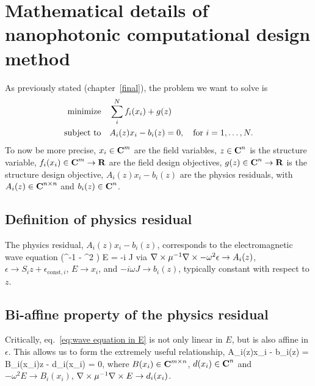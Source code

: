 \renewcommand{\eq}[1]{eq.~\eqref{eq:#1}}
\renewcommand{\EE}[2]{\begin{subequations}\begin{align}#2\end{align}\label{eq:#1}\end{subequations}}
\chapter[Computational design mathematics]{Mathematical details of nanophotonic computational design method} 
\label{maths}
As previously stated (chapter~\ref{final}), the problem we want to solve is 
    \EE {rigorous problem statement}
        {\minimize&  \sum_i^N f_i(x_i) + g(z) \\
        \subto&     A_i(z)x_i - b_i(z) = 0,\quad\text{for $i = 1, \ldots, N.$}}
To now be more precise,
    \BI $x_i \in {\mbox{\bf C}}^m$ are the field variables,
    \I  $z \in {\mbox{\bf C}}^n$ is the structure variable,
    \I  $f_i(x_i) \in {\mbox{\bf C}}^m \to {\mbox{\bf R}}$ are the field design objectives,
    \I  $g(z) \in {\mbox{\bf C}}^n \to {\mbox{\bf R}}$ is the structure design objective,
    \I  $A_i(z)x_i - b_i(z)$ are the physics residuals, with
    \I  $A_i(z) \in {\mbox{\bf C}}^{n \times n}$ and
    \I  $b_i(z) \in {\mbox{\bf C}}^n$. \EI

\section{Definition of physics residual}
The physics residual, $A_i(z)x_i - b_i(z)$, 
    corresponds to the electromagnetic wave equation
        {(\curl \mu^{-1} \curl - \omega^2 \epsilon) E = -i \omega J}
        via
    \BI $\nabla\times \mu^{-1} \nabla\times - \omega^2 \epsilon \to A_i(z)$, %
    \I  $\epsilon \to S_i z + \epsilon_{\text{const}, i}$,
    \I  $E \to x_i$, and
    \I  $-i \omega J \to b_i(z)$, typically constant with respect to $z$. \EI

\section{Bi-affine property of the physics residual}
Critically, \eq{wave equation in E} is not only linear in $E$,
    but is also affine in $\epsilon$.
This allows us to form the extremely useful relationship,
        {A_i(z)x_i - b_i(z) = B_i(x_i)z - d_i(x_i) = 0,}
    where $B(x_i) \in {\mbox{\bf C}}^{m \times n}$, $d(x_i) \in {\mbox{\bf C}}^n$ and
    \BI  $-\omega^2 E \to B_i(x_i)$, 
    \I  $\nabla\times \mu^{-1} \nabla\times E \to d_i(x_i)$. \EI


